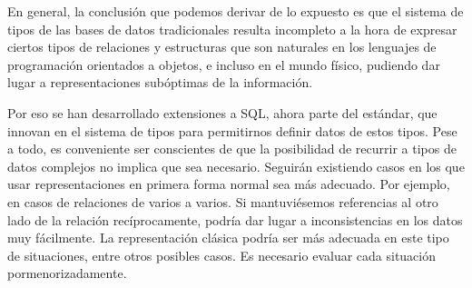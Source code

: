\documentclass[12pt, a4paper]{article}
\begin{document}
En general, la conclusión que podemos derivar de lo expuesto es que el sistema de tipos de las bases de datos tradicionales resulta incompleto a la hora de expresar ciertos tipos de relaciones y estructuras que son naturales en los lenguajes de programación orientados a objetos, e incluso en el mundo físico, pudiendo dar lugar a representaciones subóptimas de la información.

Por eso se han desarrollado extensiones a SQL, ahora parte del estándar, que innovan en el sistema de tipos para permitirnos definir datos de estos tipos. Pese a todo, es conveniente ser conscientes de que la posibilidad de recurrir a tipos de datos complejos no implica que sea necesario. Seguirán existiendo casos en los que usar representaciones en primera forma normal sea más adecuado. Por ejemplo, en casos de relaciones de varios a varios. Si mantuviésemos referencias al otro lado de la relación recíprocamente, podría dar lugar a inconsistencias en los datos muy fácilmente. La representación clásica podría ser más adecuada en este tipo de situaciones, entre otros posibles casos. Es necesario evaluar cada situación pormenorizadamente.

\nocite{*}

\end{document}
